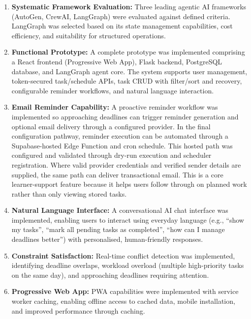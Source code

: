 \documentclass[12pt]{article}
\begin{document}
\begin{enumerate}
    \item \textbf{Systematic Framework Evaluation:} Three leading agentic AI frameworks (AutoGen, CrewAI, LangGraph) were evaluated against defined criteria. LangGraph was selected based on its state management capabilities, cost efficiency, and suitability for structured operations.
    
    \item \textbf{Functional Prototype:} A complete prototype was implemented comprising a React frontend (Progressive Web App), Flask backend, PostgreSQL database, and LangGraph agent core. The system supports user management, token-secured task/schedule APIs, task CRUD with filter/sort and recovery, configurable reminder workflows, and natural language interaction.
    
    \item \textbf{Email Reminder Capability:} A proactive reminder workflow was implemented so approaching deadlines can trigger reminder generation and optional email delivery through a configured provider. In the final configuration pathway, reminder execution can be automated through a Supabase-hosted Edge Function and cron schedule. This hosted path was configured and validated through dry-run execution and scheduler registration. Where valid provider credentials and verified sender details are supplied, the same path can deliver transactional email. This is a core learner-support feature because it helps users follow through on planned work rather than only viewing stored tasks.
    
    \item \textbf{Natural Language Interface:} A conversational AI chat interface was implemented, enabling users to interact using everyday language (e.g., ``show my tasks'', ``mark all pending tasks as completed'', ``how can I manage deadlines better'') with personalised, human-friendly responses.
    
    \item \textbf{Constraint Satisfaction:} Real-time conflict detection was implemented, identifying deadline overlaps, workload overload (multiple high-priority tasks on the same day), and approaching deadlines requiring attention.
    
    \item \textbf{Progressive Web App:} PWA capabilities were implemented with service worker caching, enabling offline access to cached data, mobile installation, and improved performance through caching.
    

\end{enumerate}
\end{document}
